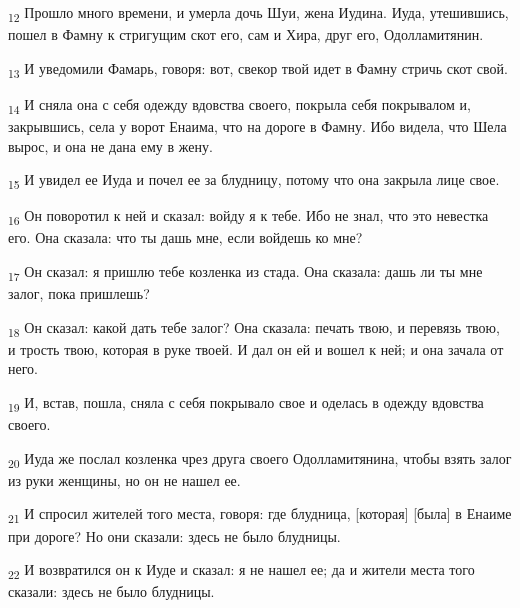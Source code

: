 \begin{tcolorbox}
\textsubscript{12} Прошло много времени, и умерла дочь Шуи, жена Иудина. Иуда, утешившись, пошел в Фамну к стригущим скот его, сам и Хира, друг его, Одолламитянин.
\end{tcolorbox}
\begin{tcolorbox}
\textsubscript{13} И уведомили Фамарь, говоря: вот, свекор твой идет в Фамну стричь скот свой.
\end{tcolorbox}
\begin{tcolorbox}
\textsubscript{14} И сняла она с себя одежду вдовства своего, покрыла себя покрывалом и, закрывшись, села у ворот Енаима, что на дороге в Фамну. Ибо видела, что Шела вырос, и она не дана ему в жену.
\end{tcolorbox}
\begin{tcolorbox}
\textsubscript{15} И увидел ее Иуда и почел ее за блудницу, потому что она закрыла лице свое.
\end{tcolorbox}
\begin{tcolorbox}
\textsubscript{16} Он поворотил к ней и сказал: войду я к тебе. Ибо не знал, что это невестка его. Она сказала: что ты дашь мне, если войдешь ко мне?
\end{tcolorbox}
\begin{tcolorbox}
\textsubscript{17} Он сказал: я пришлю тебе козленка из стада. Она сказала: дашь ли ты мне залог, пока пришлешь?
\end{tcolorbox}
\begin{tcolorbox}
\textsubscript{18} Он сказал: какой дать тебе залог? Она сказала: печать твою, и перевязь твою, и трость твою, которая в руке твоей. И дал он ей и вошел к ней; и она зачала от него.
\end{tcolorbox}
\begin{tcolorbox}
\textsubscript{19} И, встав, пошла, сняла с себя покрывало свое и оделась в одежду вдовства своего.
\end{tcolorbox}
\begin{tcolorbox}
\textsubscript{20} Иуда же послал козленка чрез друга своего Одолламитянина, чтобы взять залог из руки женщины, но он не нашел ее.
\end{tcolorbox}
\begin{tcolorbox}
\textsubscript{21} И спросил жителей того места, говоря: где блудница, [которая] [была] в Енаиме при дороге? Но они сказали: здесь не было блудницы.
\end{tcolorbox}
\begin{tcolorbox}
\textsubscript{22} И возвратился он к Иуде и сказал: я не нашел ее; да и жители места того сказали: здесь не было блудницы.
\end{tcolorbox}

